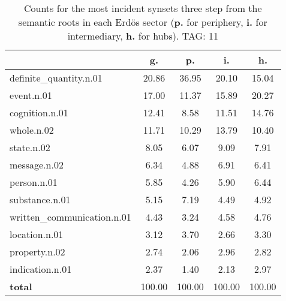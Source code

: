 \begin{table}[h!]
\begin{center}
\begin{tabular}{| l || c | c | c | c |}\hline
 & {\bf g.} & {\bf p.} & {\bf i.} & {\bf h.} \\\hline\hline
definite\_quantity.n.01 & 20.86  & 36.95  & 20.10  & 15.04 \\\hline
event.n.01 & 17.00  & 11.37  & 15.89  & 20.27 \\\hline
cognition.n.01 & 12.41  & 8.58  & 11.51  & 14.76 \\\hline
whole.n.02 & 11.71  & 10.29  & 13.79  & 10.40 \\\hline
state.n.02 & 8.05  & 6.07  & 9.09  & 7.91 \\\hline
message.n.02 & 6.34  & 4.88  & 6.91  & 6.41 \\\hline
person.n.01 & 5.85  & 4.26  & 5.90  & 6.44 \\\hline
substance.n.01 & 5.15  & 7.19  & 4.49  & 4.92 \\\hline
written\_communication.n.01 & 4.43  & 3.24  & 4.58  & 4.76 \\\hline
location.n.01 & 3.12  & 3.70  & 2.66  & 3.30 \\\hline
property.n.02 & 2.74  & 2.06  & 2.96  & 2.82 \\\hline
indication.n.01 & 2.37  & 1.40  & 2.13  & 2.97 \\\hline\hline
{{\bf total}} & 100.00  & 100.00  & 100.00  & 100.00 \\\hline
\end{tabular}
\caption{Counts for the most incident synsets three step from the semantic roots in each Erd\"os sector ({\bf p.} for periphery, {\bf i.} for intermediary, {\bf h.} for hubs). TAG: 11}
\end{center}
\end{table}